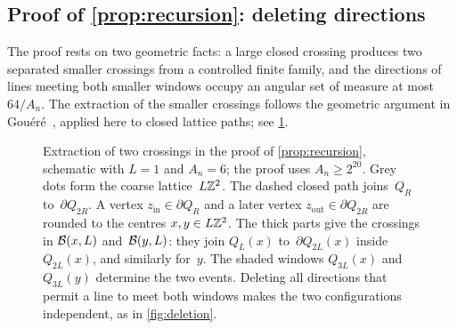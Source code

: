\documentclass[11pt,letterpaper]{article}
\begin{document}
\subsection{Proof of \texorpdfstring{\cref{prop:recursion}}{the recursion}: deleting directions}
\label{sec:recursion}

The proof rests on two geometric facts: a large closed crossing produces two separated smaller crossings from a controlled finite family, and the directions of lines meeting both smaller windows occupy an angular set of measure at most $64/A_n$. The extraction of the smaller crossings follows the geometric argument in Gou\'er\'e~\cite[Lemma~3.3]{Gou08}, applied here to closed lattice paths; see \cref{fig:recursion}.

\begin{figure}[ht]
  \centering
  
  \caption{Extraction of two crossings in the proof of \cref{prop:recursion}, schematic with $L=1$ and $A_n=6$; the proof uses $A_n\ge2^{20}$. Grey dots form the coarse lattice~$L\mathbb Z^2$. The dashed closed path joins~$Q_R$ to~$\partial Q_{2R}$. A vertex $z_{\mathrm{in}}\in\partial Q_R$ and a later vertex $z_{\mathrm{out}}\in\partial Q_{2R}$ are rounded to the centres $x,y\in L\mathbb Z^2$. The thick parts give the crossings in $\mathcal B(x,L)$ and~$\mathcal B(y,L)$: they join $Q_L(x)$ to~$\partial Q_{2L}(x)$ inside~$Q_{2L}(x)$, and similarly for~$y$. The shaded windows $Q_{3L}(x)$ and $Q_{3L}(y)$ determine the two events. Deleting all directions that permit a line to meet both windows makes the two configurations independent, as in \cref{fig:deletion}.}
  \label{fig:recursion}
\end{figure}
\end{document}
